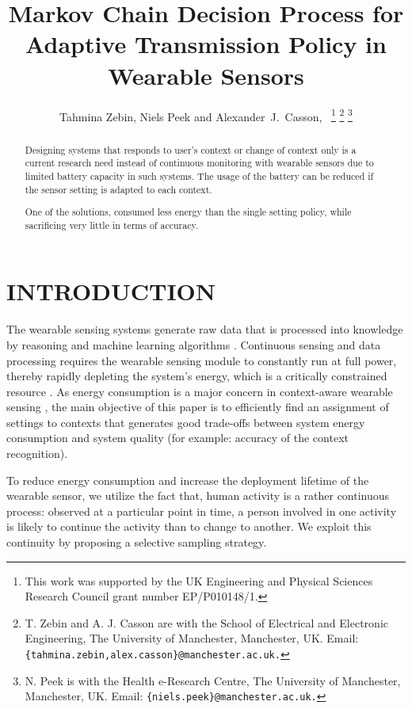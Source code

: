 \documentclass[letterpaper, 10pt, conference]{IEEEtran} %
\title{\LARGE \bf Markov Chain Decision Process for Adaptive Transmission Policy in Wearable Sensors }
\author{Tahmina Zebin, Niels Peek and Alexander~J.~Casson,~\IEEEmembership{Senior Member,~IEEE}%
\thanks{This work was supported by the UK Engineering and Physical Sciences Research Council grant number EP/P010148/1.}%
\thanks{T. Zebin and A. J. Casson are with the School of Electrical and Electronic Engineering, The University of Manchester, Manchester, UK. Email: \tt{\small{\{tahmina.zebin,alex.casson\}@manchester.ac.uk}}.}%
\thanks{ N. Peek is with the Health e-Research Centre, The University of Manchester, Manchester, UK. Email: \tt{\small{\{niels.peek\}@manchester.ac.uk}}.}%
}%
\begin{document}
\maketitle
\thispagestyle{empty} %
\pagestyle{empty}




\begin{abstract}
Designing systems that responds to user’s context or change of context only is a current research need instead of continuous monitoring with wearable sensors  due to limited battery capacity in such systems. The usage of the battery can be reduced if the sensor setting is adapted to each context. 

One of the solutions, consumed less energy than the single setting policy, while sacrificing very little in terms of accuracy.

\end{abstract}
\section{INTRODUCTION}

\label{sec:introduction}
The wearable sensing systems generate raw data that is processed into knowledge by reasoning and machine learning algorithms \cite{Xenofon2017}. Continuous sensing and data processing requires the wearable sensing module to constantly run at full power, thereby rapidly depleting the system’s energy, which is a critically
constrained resource \cite{krause2005}. As energy consumption is a major concern in context-aware wearable sensing \cite{Yan2012}, the main objective of this paper is to efficiently find an assignment of settings to contexts that generates good trade-offs between system energy consumption and system quality (for example: accuracy of the context recognition).



To reduce energy consumption and increase the
deployment lifetime of the wearable sensor, we utilize the fact that, human activity is a rather continuous process: observed at a particular point in time, a person involved in one activity is likely to continue the activity than to change to another. We exploit this continuity by proposing a selective sampling strategy. 
\end{document}
